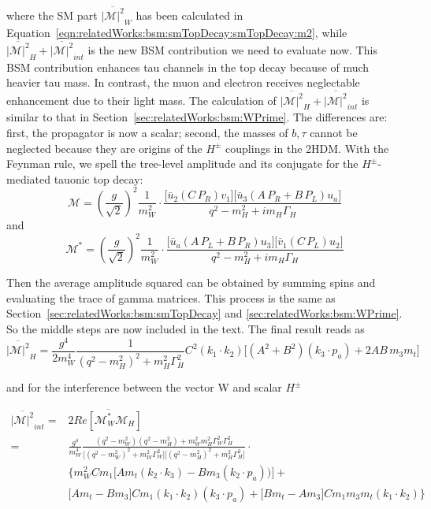 \noindent where the SM part $\overline{ |\mathcal{M}|^2 } _{W} $  has been calculated in Equation~\ref{eqn:relatedWorks:bsm:smTopDecay:smTopDecay:m2}, while $\overline{ |\mathcal{M}|^2 } _{H} +  \overline{ |\mathcal{M}|^2 } _{int}$ is the new BSM contribution we need to evaluate now. This BSM contribution enhances tau channels in the top decay because of much heavier tau mass. In contrast, the muon and electron receives neglectable enhancement due to their light mass. The calculation of $\overline{ |\mathcal{M}|^2 } _{H} +  \overline{ |\mathcal{M}|^2 } _{int}$ is similar to that in Section~\ref{sec:relatedWorks:bsm:WPrime}. The differences are: first, the propagator is now a scalar; second, the masses of $b,\tau$  cannot be neglected because they are origins of the $H^\pm$ couplings in the 2HDM. With the Feynman rule, we spell the tree-level amplitude and its conjugate for the $H^\pm$-mediated tauonic top decay:
\begin{equation}
	\mathcal{M}  =  (\frac{g }{\sqrt{2}})^2 \frac{1}{m^2_W}  \cdot
	\frac{\big[ \bar{u}_2 ( C  \, P_R) v_1 \big] \big[ \bar{u}_3  (A \, P_R + B  \, P_L) u_a \big]  }{q^2-m^2_{H} + i m_{H} \Gamma_{H}} 
\end{equation}
\noindent and
\begin{equation}
	\mathcal{M}^*  =  (\frac{g }{\sqrt{2}})^2 \frac{1}{m^2_W}  \cdot 
    \frac{ \big[ \bar{u}_a  (A \, P_L + B  \, P_R) u_3 \big] \big[ \bar{v}_1 ( C  \, P_L) u_2 \big]  }{q^2-m^2_{H} + i m_{H} \Gamma_{H}} 
\end{equation}

\noindent Then the average amplitude squared can be obtained by summing spins and evaluating the trace of gamma matrices. This process is the same as Section~\ref{sec:relatedWorks:bsm:smTopDecay} and \ref{sec:relatedWorks:bsm:WPrime}. So the middle steps are now included in the text. The final result reads as
\begin{equation}
	\overline{ |\mathcal{M}|^2 }_{H} = \frac{g^4}{2 m^4_W} \frac{1}{ (q^2-m^2_{H})^2 +  m^2_{H} \Gamma^2_{H}} 
    C^2 (k_1 \cdot k_2) \bigg[ (A^2 + B^2) (k_3 \cdot p_a ) + 2 AB \, m_3  m_t\bigg]
\end{equation}


\noindent and for the interference between the vector W and scalar $H^\pm$ 

\begin{equation}
\begin{split}
    \overline{ |\mathcal{M}|^2 } _{int} = &   2 \overline{ Re[\mathcal{M}^*_W \mathcal{M}_{H}] }  \\
    =& \frac{g ^4}{m_W^4} \frac
    {( q^2-m^2_{W}) ( q^2-m^2_{H}) + m^2_{W}  m^2_{H}  \Gamma^2_{W} \Gamma^2_H }
    { \big[ ( q^2-m^2_{W})^2 +  m^2_{W} \Gamma^2_{W} \big] \big[ (  q^2-m^2_{H})^2 +  m^2_{H} \Gamma^2_{H} \big] }  \cdot \\
    & \bigg\{
    m_W^2  C m_1 \big[A  m_t (k_2 \cdot k_3) - B m_3 (k_2 \cdot p_a) ) \big] + \\
    & \big[A m_t - B m_3 \big] C m_1  (k_1 \cdot k_2) (k_3 \cdot p_a)   +  \big[B m_t - A m_3\big]  C m_1 m_3  m_t (k_1 \cdot k_2)  
    \bigg\}
\end{split}
\end{equation}

